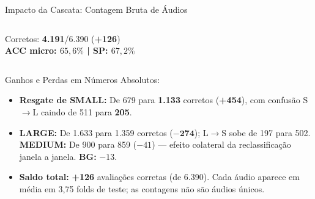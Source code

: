 \documentclass[aspectratio=169]{beamer}
\begin{document}
\begin{frame}{Impacto da Cascata: Contagem Bruta de \'{A}udios}
\begin{columns}[T]
        \scriptsize
        Corretos: \textbf{4.191}/6.390 (\textbf{+126}) \\
        \textbf{ACC micro: $65,6\%$ | SP: $67,2\%$}
    \end{columns}

    \vspace{0.15cm}
    \begin{block}{\small Ganhos e Perdas em N\'{u}meros Absolutos:}
        \scriptsize
        \begin{itemize}
            \setlength{\itemsep}{1pt}
            \item \textbf{Resgate de SMALL:} De 679 para \textbf{1.133} corretos (\textbf{+454}), com confus\~{a}o S$\to$L caindo de 511 para \textbf{205}.
            \item \textbf{LARGE:} De 1.633 para 1.359 corretos ($\mathbf{-274}$); L$\to$S sobe de 197 para 502. \textbf{MEDIUM:} De 900 para 859 ($-41$) --- efeito colateral da reclassifica\c{c}\~{a}o janela a janela. \textbf{BG:} $-13$.
            \item \textbf{Saldo total:} \textbf{+126} avalia\c{c}\~{o}es corretas (de 6.390). Cada \'{a}udio aparece em m\'{e}dia em 3,75 folds de teste; as contagens n\~{a}o s\~{a}o \'{a}udios \'{u}nicos.
        \end{itemize}
    \end{block}
\end{frame}
\end{document}
